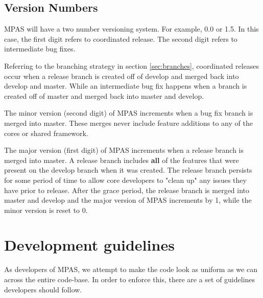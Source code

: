 \documentclass[11pt]{report}
\begin{document}
\section{Version Numbers}
\label{sec:version-numbers}
MPAS will have a two number versioning system. For example, 0.0 or 1.5. In this
case, the first digit refers to coordinated release. The second digit refers to
intermediate bug fixes.

Referring to the branching strategy in section \ref{sec:branches}, coordinated
releases occur when a release branch is created off of develop and merged back
into develop and master. While an intermediate bug fix happens when a branch is
created off of master and merged back into master and develop.

The minor version (second digit) of MPAS increments when a bug fix branch is
merged into master. These merges never include feature additions to any of the
cores or shared framework.

The major version (first digit) of MPAS increments when a release branch is
merged into master. A release branch includes {\bf all} of the features that
were present on the develop branch when it was created. The release branch
persists for some period of time to allow core developers to "clean up" any
issues they have prior to release. After the grace period, the release branch
is merged into master and develop and the major version of MPAS increments by
1, while the minor version is reset to 0.

\chapter{Development guidelines}
\label{chap:code-guidelines}
As developers of MPAS, we attempt to make the code look as uniform as we can
across the entire code-base. In order to enforce this, there are a set of
guidelines developers should follow.
\end{document}
